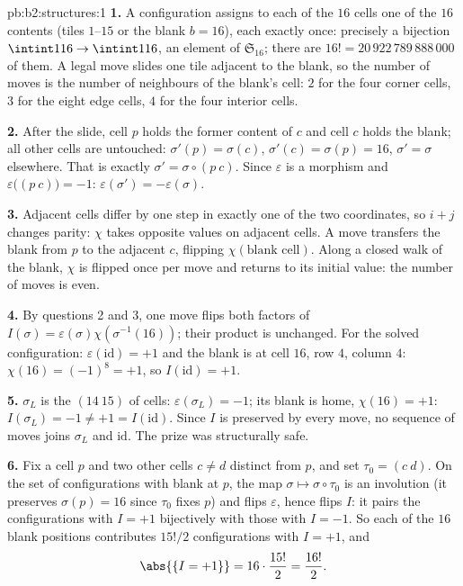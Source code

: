\begin{solution}{pb:b2:structures:1}
\textbf{1.} A configuration assigns to each of the $16$ cells one
of the $16$ contents (tiles $1$--$15$ or the blank $b = 16$),
each exactly once: precisely a bijection $\intint1{16} \to
\intint1{16}$, an element of $\mathfrak{S}_{16}$; there are $16!
= 20\,922\,789\,888\,000$ of them. A legal move slides one tile
adjacent to the blank, so the number of moves is the number of
neighbours of the blank's cell: $2$ for the four corner cells,
$3$ for the eight edge cells, $4$ for the four interior cells.

\textbf{2.} After the slide, cell $p$ holds the former content of
$c$ and cell $c$ holds the blank; all other cells are untouched:
$\sigma'(p) = \sigma(c)$, $\sigma'(c) = \sigma(p) = 16$,
$\sigma' = \sigma$ elsewhere. That is exactly $\sigma' = \sigma
\circ (p\ c)$. Since $\varepsilon$ is a morphism and
$\varepsilon\bigl((p\ c)\bigr) = -1$:
$\varepsilon(\sigma') = -\varepsilon(\sigma)$.

\textbf{3.} Adjacent cells differ by one step in exactly one of
the two coordinates, so $i + j$ changes parity: $\chi$ takes
opposite values on adjacent cells. A move transfers the blank
from $p$ to the adjacent $c$, flipping $\chi(\text{blank cell})$.
Along a closed walk of the blank, $\chi$ is flipped once per move
and returns to its initial value: the number of moves is even.

\textbf{4.} By questions 2 and 3, one move flips both factors of
$I(\sigma) = \varepsilon(\sigma)\chi(\sigma^{-1}(16))$; their
product is unchanged. For the solved configuration:
$\varepsilon(\mathrm{id}) = +1$ and the blank is at cell $16$,
row $4$, column $4$: $\chi(16) = (-1)^{8} = +1$, so
$I(\mathrm{id}) = +1$.

\textbf{5.} $\sigma_L$ is the  $(14\ 15)$ of cells:
$\varepsilon(\sigma_L) = -1$; its blank is home, $\chi(16) = +1$:
$I(\sigma_L) = -1 \neq +1 = I(\mathrm{id})$. Since $I$ is
preserved by every move, no sequence of moves joins $\sigma_L$
and $\mathrm{id}$. The prize was structurally safe.

\textbf{6.} Fix a cell $p$ and two other cells $c \neq d$
distinct from $p$, and set $\tau_0 = (c\ d)$. On the set of
configurations with blank at $p$, the map $\sigma \mapsto \sigma
\circ \tau_0$ is an involution (it preserves $\sigma(p) = 16$
since $\tau_0$ fixes $p$) and flips $\varepsilon$, hence flips
$I$: it pairs the configurations with $I = +1$ bijectively with
those with $I = -1$. So each of the $16$ blank positions
contributes $15!/2$ configurations with $I = +1$, and
\[
\abs{\{I = +1\}} = 16 \cdot \frac{15!}{2} = \frac{16!}{2}.
\]


\end{solution}
